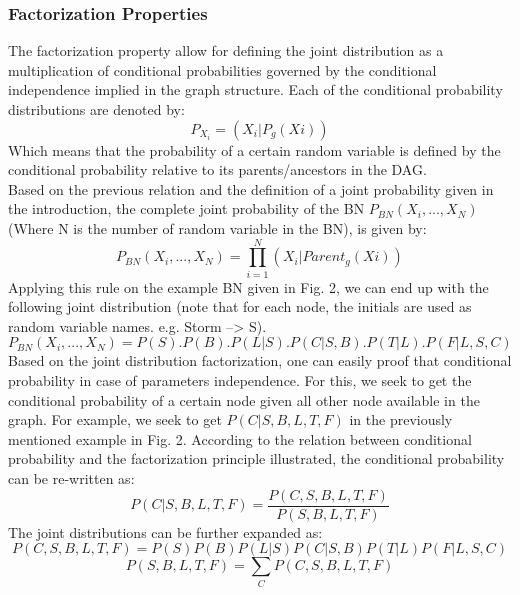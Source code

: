 \documentclass{article}
\begin{document}
\subsubsection{Factorization Properties}
The factorization property allow for defining the joint distribution as a multiplication of conditional probabilities governed by the conditional independence implied in the graph structure. Each of the conditional probability distributions are denoted by:
\begin{equation}
P_{X_i} = (X_i | P_g (Xi))
\end{equation}
Which means that the probability of a certain random variable is defined by the conditional probability relative to its parents/ancestors in the DAG. \\
Based on the previous relation and the definition of a joint probability given in the introduction, the complete joint probability of the BN $P_{BN}(X_i, ..., X_N)$ (Where N is the number of random variable in the BN), is given by:
\begin{equation}
P_{BN}(X_i, ..., X_N) = \prod_{i=1}^{N} (X_i | {Parent}_g (Xi))
\end{equation}
Applying this rule on the example BN given in Fig. 2, we can end up with the following joint distribution (note that for each node, the initials are used as random variable names. e.g. Storm --> S).
\begin{equation}
P_{BN}(X_i, ..., X_N) = P(S).P(B).P(L|S).P(C|S,B).P(T|L).P(F|L,S,C)
\end{equation}
Based on the joint distribution factorization, one can easily proof that conditional probability in case of parameters independence. For this, we seek to get the conditional probability of a certain node given all other node available in the graph. For example, we seek to get $P(C|S,B, L, T, F)$ in the previously mentioned example in Fig. 2. According to the relation between conditional probability and the factorization principle illustrated, the conditional probability can be re-written as:
\begin{equation}
P(C|S,B, L, T, F) = \frac{P(C,S,B,L,T,F)}{P(S,B,L,T,F)}
\end{equation}
The joint distributions can be further expanded as:
\begin{equation}
P(C,S,B,L,T,F) = P(S)P(B)P(L|S)P(C|S,B)P(T|L)P(F|L,S,C)
\end{equation}
\begin{equation}
P(S,B,L,T,F) = \sum_{C} P(C,S,B,L,T,F)
\end{equation}
\end{document}
